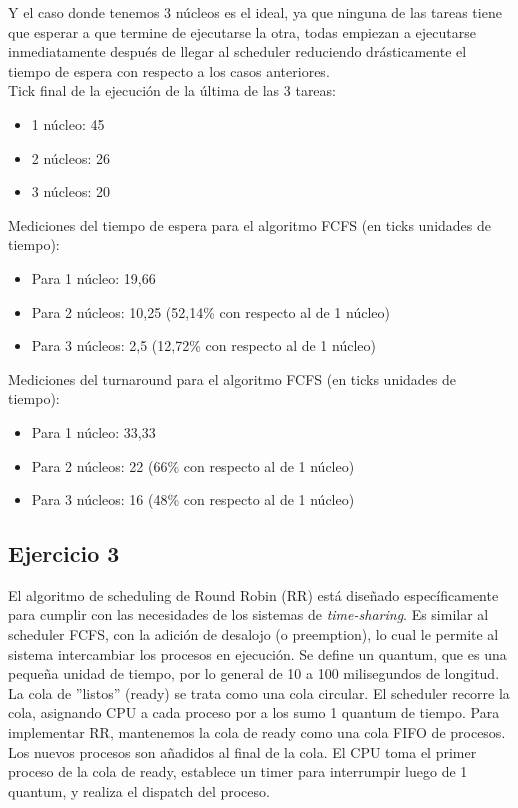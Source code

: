 Y el caso donde tenemos 3 núcleos es el ideal, ya que ninguna de las tareas tiene que esperar a que termine de ejecutarse la otra, todas empiezan a ejecutarse inmediatamente después de llegar al scheduler reduciendo drásticamente el tiempo de espera con respecto a los casos anteriores. \\

\noindent
Tick final de la ejecución de la última de las 3 tareas:
\begin{itemize}
	\item 1 núcleo: 45
	\item 2 núcleos: 26
	\item 3 núcleos: 20
\end{itemize}

\noindent
Mediciones del tiempo de espera para el algoritmo FCFS (en ticks unidades de tiempo):
\begin{itemize}
	\item Para 1 núcleo: 19,66
	\item Para 2 núcleos: 10,25 (52,14\% con respecto al de 1 núcleo)
	\item Para 3 núcleos: 2,5 (12,72\% con respecto al de 1 núcleo)
\end{itemize}

\noindent
Mediciones del turnaround para el algoritmo FCFS (en ticks unidades de tiempo):
\begin{itemize}
	\item Para 1 núcleo: 33,33
	\item Para 2 núcleos: 22 (66\% con respecto al de 1 núcleo)
	\item Para 3 núcleos: 16 (48\% con respecto al de 1 núcleo)
\end{itemize}


\subsection{Ejercicio 3}

\noindent

El algoritmo de scheduling de Round Robin\cite{silberschatz2009operating} (RR) está diseñado específicamente para cumplir con las necesidades de los sistemas de \textit{time-sharing}. Es similar al scheduler FCFS, con la adición de desalojo (o preemption), lo cual le permite al sistema intercambiar los procesos en ejecución. Se define un quantum, que es una pequeña unidad de tiempo, por lo general de 10 a 100 milisegundos de longitud. La cola de ''listos'' (ready) se trata como una cola circular. El scheduler recorre la cola, asignando CPU a cada proceso por a los sumo 1 quantum de tiempo.
Para implementar RR, mantenemos la cola de ready como una cola FIFO de procesos. Los nuevos procesos son añadidos al final de la cola.  El CPU toma el primer proceso de la cola de ready, establece un timer para interrumpir luego de 1 quantum, y realiza el dispatch del proceso. \\

